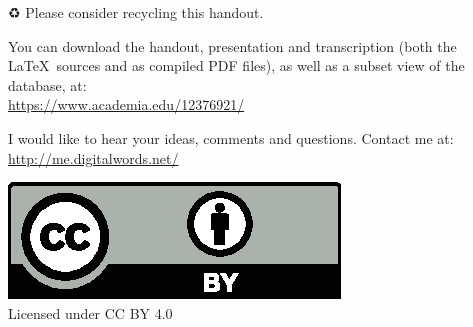 \vfill


\begin{center}
\begin{extra}
	{♻} Please consider recycling this handout.
	
	You can download the handout, presentation and transcription (both the \LaTeX\ sources and as compiled PDF files), as well as a subset view of the database, at:\\
	\url{https://www.academia.edu/12376921/}

	I would like to hear your ideas, comments and questions. Contact me at:\\
	\url{http://me.digitalwords.net/}

	\includegraphics[width=0.20\linewidth]{../cc-by.eps}\\
	Licensed under CC BY 4.0
\end{extra}
\end{center}
